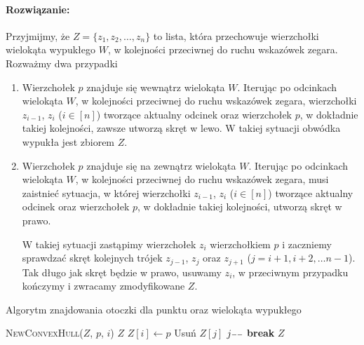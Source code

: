 \paragraph{Rozwiązanie:}
Przyjmijmy, że $Z = \{z_1, z_2, \ldots, z_n\}$ to lista, która przechowuje wierzchołki
wielokąta wypukłego $W$, w kolejności przeciwnej do ruchu wskazówek zegara.
Rozważmy dwa przypadki
\begin{enumerate}
	\item Wierzchołek $p$ znajduje się wewnątrz wielokąta $W$. Iterując po odcinkach
	wielokąta $W$, w kolejności przeciwnej do ruchu wskazówek zegara, wierzchołki
	$z_{i-1}$, $z_i$ ($i \in [n]$) tworzące aktualny odcinek oraz wierzchołek $p$, w dokładnie takiej kolejności, zawsze utworzą skręt w lewo. W takiej sytuacji obwódka wypukła jest zbiorem $Z$.
	
	\item Wierzchołek $p$ znajduje się na zewnątrz wielokąta $W$. Iterując po odcinkach
	wielokąta $W$, w kolejności przeciwnej do ruchu wskazówek zegara, musi zaistnieć sytuacja, w której wierzchołki
	$z_{i-1}$, $z_i$ ($i \in [n]$) tworzące aktualny odcinek oraz wierzchołek $p$, w dokładnie takiej kolejności, utworzą skręt w prawo.
	
	W takiej sytuacji zastąpimy wierzchołek $z_i$ wierzchołkiem $p$ i zaczniemy 
	sprawdzać skręt kolejnych trójek $z_{j-1}$, $z_j$ oraz $z_{j+1}$
	($j = i + 1, i + 2, \dots n - 1$). Tak długo
	jak skręt będzie w prawo, usuwamy $z_i$, w przeciwnym przypadku kończymy i zwracamy zmodyfikowane $Z$.
\end{enumerate}

\begin{algorithm}[H]
	\caption{Algorytm znajdowania otoczki dla punktu oraz wielokąta wypukłego}
	\begin{algorithmic}[1]
		\State \Return \textsc{NewConvexHull}($Z$, $p$, $i$)
		\EndIf
		\EndFor
		\State \Return $Z$
		\EndProcedure		
		\State $Z[i] \gets p$
		\State Usuń $Z[j]$
		\State $j\mm$ 
		\Else
		\State \textbf{break}
		\EndIf
		\EndFor
		\State \Return $Z$
		\EndProcedure
	\end{algorithmic}
\end{algorithm}

